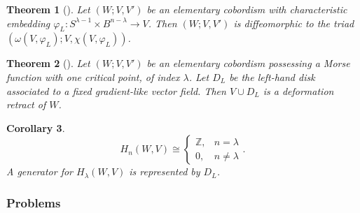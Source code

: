 \documentclass[reqno]{amsart}
\newtheorem{theorem}{Theorem}[section]
\newtheorem{corollary}[theorem]{Corollary}
\theoremstyle{definition}
\theoremstyle{remark}
\begin{document}
\begin{theorem}[]
    Let $\left( W; V, V' \right) $ be an elementary cobordism
    with characteristic embedding
    $\varphi_L \colon S^{\lambda-1} \times 
    B^{n-\lambda} \to V$. Then
    $\left( W; V, V' \right) $ is diffeomorphic to
    the triad $\left( \omega (V, \varphi_L); V,
    \chi \left( V, \varphi_L \right) \right) $.
\end{theorem}

\begin{theorem}[]
    Let $\left( W; V,V' \right) $ be an elementary
    cobordism possessing a Morse function with one
    critical point, of index $\lambda$. Let
    $D_L$ be the left-hand disk associated to a fixed
    gradient-like vector field. Then
    $V \cup  D_L$ is a deformation retract of $W$.
\end{theorem}

\begin{corollary}
    \[
    H_n (W,V)
    \cong
    \begin{cases}
        \mathbb{Z},& n= \lambda\\
        0,& n\neq \lambda
    \end{cases}.
    \] 
    A generator for $H_{\lambda}(W,V)$ is represented
    by $D_L$.
\end{corollary}



        \newpage

        \subsubsection{Problems}
\end{document}

